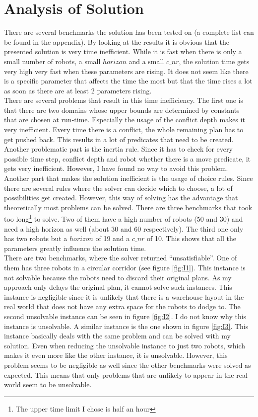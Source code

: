 \documentclass[runningheads]{llncs}
\begin{document}
\section{Analysis of Solution}
There are several benchmarks the solution has been tested on (a complete list can be found in the appendix). By looking at the results it is obvious that the presented solution is very time inefficient. While it is fast when there is only a small number of robots, a small $horizon$ and a small $c\_nr$, the solution time gets very high very fast when these parameters are rising. It does not seem like there is a specific parameter that affects the time the most but that the time rises a lot as soon as there are at least 2 parameters rising. \\
There are several problems that result in this time inefficiency. The first one is that there are two domains whose upper bounds are determined by constants that are chosen at run-time. Especially the usage of the conflict depth makes it very inefficient. Every time there is a conflict, the whole remaining plan has to get pushed back. This results in a lot of predicates that need to be created. Another problematic part is the inertia rule. Since it has to check for every possible time step, conflict depth and robot whether there is a move predicate, it gets very inefficient. However, I have found no way to avoid this problem. \\
Another part that makes the solution inefficient is the usage of choice rules. Since there are several rules where the solver can decide which to choose, a lot of possibilities get created. However, this way of solving has the advantage that theoretically most problems can be solved. 
There are three benchmarks that took too long\footnote{The upper time limit I chose is half an hour} to solve. Two of them have a high number of robots (50 and 30) and need a high horizon as well (about 30 and 60 respectively). The third one only has two robots but a $horizon$ of 19 and a $c\_nr$ of 10. This shows that all the parameters greatly influence the solution time. \\
There are two benchmarks, where the solver returned ``unsatisfiable''. One of them has three robots in a circular corridor (see figure \ref{fig:I1}). This instance is not solvable because the robots need to discard their original plans. As my approach only delays the original plan, it cannot solve such instances. This instance is negligible since it is unlikely that there is a warehouse layout in the real world that does not have any extra space for the robots to dodge to. The second unsolvable instance can be seen in figure \ref{fig:I2}. I do not know why this instance is unsolvable. A similar instance is the one shown in figure \ref{fig:I3}. This instance basically deals with the same problem and can be solved with my solution. Even when reducing the unsolvable instance to just two robots, which makes it even more like the other instance, it is unsolvable. However, this problem seems to be negligible as well since the other benchmarks were solved as expected. This means that only problems that are unlikely to appear in the real world seem to be unsolvable. \\
\end{document}

